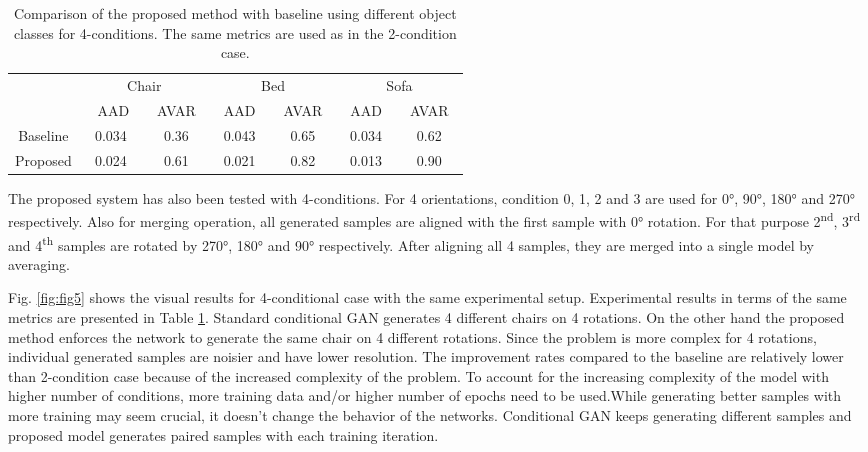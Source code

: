 \documentclass[runningheads]{llncs}
\begin{document}
\begin{table}
\caption{Comparison of the proposed method with baseline using different object classes for 4-conditions. The same metrics are used as in the 2-condition case.}\label{tab2}
\centering
\normalsize
\begin{tabular}{|c|c|c|c|c|c|c|}
\hline
\multirow{2}{*}{} & \multicolumn{2}{c|}{Chair} & \multicolumn{2}{c|}{Bed} & \multicolumn{2}{c|}{Sofa} \\ \cline{2-7} 
                  &~ AAD~          & ~AVAR~        & ~AAD~         & ~AVAR~       & ~AAD~          & ~AVAR~       \\ \hhline{|-|=|=|=|=|=|=|}
Baseline          & 0.034        & 0.36        & 0.043       & 0.65       & 0.034        & 0.62       \\ \hline
Proposed          & 0.024        & 0.61        & 0.021       & 0.82       & 0.013        & 0.90       \\ \hline
\end{tabular}
\end{table}


The proposed system has also been tested with 4-conditions. For 4 orientations, condition 0, 1, 2 and 3 are used for \ang{0}, \ang{90}, \ang{180} and \ang{270} respectively. Also for merging operation, all generated samples are aligned with the first sample with \ang{0} rotation. For that purpose 2\textsuperscript{nd}, 3\textsuperscript{rd} and 4\textsuperscript{th} samples are rotated by \ang{270}, \ang{180} and \ang{90} respectively. After aligning all 4 samples, they are merged into a single model by averaging.

	Fig. \ref{fig:fig5} shows the visual results for 4-conditional case with the same experimental setup. Experimental results in terms of the same metrics are presented in Table \ref{tab2}. Standard conditional GAN generates 4 different chairs on 4 rotations. On the other hand the proposed method enforces the network to generate the same chair on 4 different rotations. Since the problem is more complex for 4 rotations, individual generated samples are noisier and have lower resolution. The improvement rates compared to the baseline are relatively lower than 2-condition case because of the increased complexity of the problem. To account for the increasing complexity of the model with higher number of conditions, more training data and/or higher number of epochs need to be used.While generating better samples with more training may seem crucial, it doesn’t change the behavior of the networks. Conditional GAN keeps generating different samples and proposed model generates paired samples with each training iteration.
\end{document}
